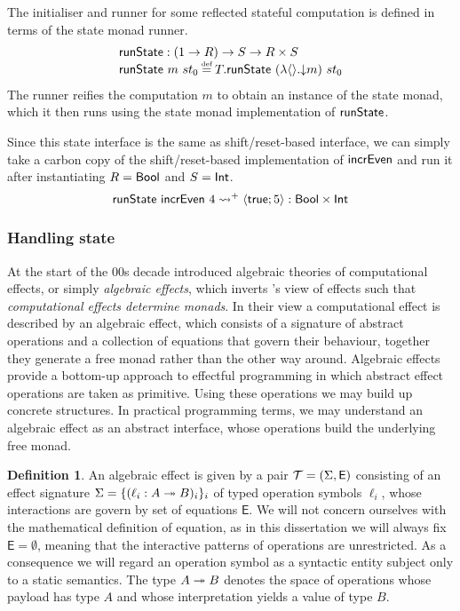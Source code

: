\documentclass[12pt,phd,lfcs,twoside,openright,logo,leftchapter,normalheadings]{infthesis}
\theoremstyle{plain}
\theoremstyle{definition}
\newtheorem{definition}[theorem]{Definition}
\begin{document}
The initialiser and runner for some reflected stateful computation is
defined in terms of the state monad runner.
%
\[
  \bl
    \runState : (\UnitType \to R) \to S \to R \times S\\
    \runState~m~st_0 \defas T.\runState~(\lambda\Unit.\reify m)~st_0
  \el
\]
%
The runner reifies the computation $m$ to obtain an instance of the
state monad, which it then runs using the state monad implementation
of $\mathsf{runState}$.

Since this state interface is the same as shift/reset-based interface,
we can simply take a carbon copy of the shift/reset-based
implementation of $\mathsf{incrEven}$ and run it after instantiating
$R = \mathsf{Bool}$ and $S = \mathsf{Int}$.
%
\[
  \mathsf{runState}~\mathsf{incrEven}~4 \leadsto^+ \langle \mathsf{true};5 \rangle : \mathsf{Bool} \times \mathsf{Int}
\]
\subsubsection{Handling state}
%
At the start of the 00s decade
\citet{PlotkinP01,PlotkinP02,PlotkinP03} introduced algebraic theories
of computational effects, or simply \emph{algebraic effects}, which
inverts \citeauthor{Moggi91}'s view of effects such that
\emph{computational effects determine monads}.  In their view a
computational effect is described by an algebraic effect, which
consists of a signature of abstract operations and a collection of
equations that govern their behaviour, together they generate a free
monad rather than the other way around.
%
Algebraic effects provide a bottom-up approach to effectful
programming in which abstract effect operations are taken as
primitive. Using these operations we may build up concrete structures.
%
In practical programming terms, we may understand an algebraic effect
as an abstract interface, whose operations build the underlying free
monad.
%
\begin{definition}
  An algebraic effect is given by a pair
  $\mathcal{T} = (\Sigma,\mathsf{E})$ consisting of an effect signature
  $\Sigma = \{(\ell_i : A \twoheadrightarrow B)_i\}_i$ of typed operation symbols
  $\ell_i$, whose interactions are govern by set of equations
  $\mathsf{E}$.
  We will not concern ourselves with the mathematical definition of
  equation, as in this dissertation we will always fix
  $\mathsf{E} = \emptyset$, meaning that the interactive patterns of
  operations are unrestricted. As a consequence we will regard an
  operation symbol as a syntactic entity subject only to a static
  semantics. The type $A \twoheadrightarrow B$ denotes the space of operations
  whose payload has type $A$ and whose interpretation yields a value
  of type $B$.
\end{definition}
\end{document}
